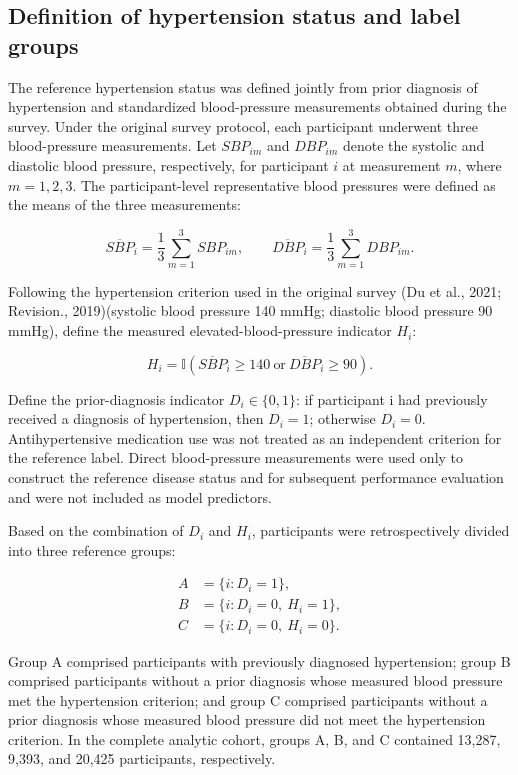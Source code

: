 \documentclass[10pt]{article}
\begin{document}
\subsection{Definition of hypertension status and label
groups}\label{definition-of-hypertension-status-and-label-groups}

The reference hypertension status was defined jointly from prior
diagnosis of hypertension and standardized blood-pressure measurements
obtained during the survey. Under the original survey protocol, each
participant underwent three blood-pressure measurements. Let
\(SBP_{im}\) and \(DBP_{im}\) denote the systolic and diastolic blood
pressure, respectively, for participant \(i\) at measurement \(m\),
where \(m = 1,2,3\). The participant-level representative blood
pressures were defined as the means of the three measurements:

\[{\overline{SBP}}_{i} = \frac{1}{3}\sum_{m = 1}^{3}SBP_{im},\quad\quad{\overline{DBP}}_{i} = \frac{1}{3}\sum_{m = 1}^{3}DBP_{im}.\]

Following the hypertension criterion used in the original survey (Du et
al., 2021; Revision., 2019)(systolic blood pressure 140 mmHg; diastolic
blood pressure 90 mmHg), define the measured elevated-blood-pressure
indicator \(H_{i}\):

\[H_{i}= \mathbb{I}\left( {\overline{SBP}}_{i} \geq 140\ \text{or}\ {\overline{DBP}}_{i} \geq 90 \right).\]

Define the prior-diagnosis indicator \(D_{i} \in \{ 0,1\}\): if
participant i had previously received a diagnosis of hypertension, then
\(D_{i} = 1\); otherwise \(D_{i} = 0\). Antihypertensive medication use
was not treated as an independent criterion for the reference label.
Direct blood-pressure measurements were used only to construct the
reference disease status and for subsequent performance evaluation and
were not included as model predictors.

Based on the combination of \(D_{i}\) and \(H_{i}\), participants were
retrospectively divided into three reference groups:

\[
\begin{aligned}
A &= \{i:D_i=1\},\\
B &= \{i:D_i=0,\ H_i=1\},\\
C &= \{i:D_i=0,\ H_i=0\}.
\end{aligned}
\]

Group A comprised participants with previously diagnosed hypertension;
group B comprised participants without a prior diagnosis whose measured
blood pressure met the hypertension criterion; and group C comprised
participants without a prior diagnosis whose measured blood pressure did
not meet the hypertension criterion. In the complete analytic cohort,
groups A, B, and C contained 13,287, 9,393, and 20,425 participants,
respectively.
\end{document}
